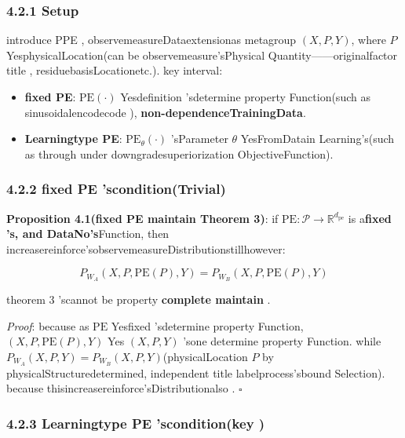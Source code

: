 \documentclass[
  12pt,
]{article}
\providecommand{\tightlist}{%
  \setlength{\itemsep}{0pt}\setlength{\parskip}{0pt}}
\begin{document}
\subsubsection{4.2.1 Setup}\label{ux8bbeux5b9a-1}

introduce  PPE , observemeasureDataextensionas metagroup \((X, P, Y)\), where \(P\)
YesphysicalLocation(can be observemeasure'sPhysical Quantity------originalfactor title , residuebasisLocationetc.). key interval: 

\begin{itemize}
\tightlist
\item
  \textbf{fixed  PE}: \(\text{PE}(\cdot)\)
  Yesdefinition 'sdetermine property Function(such as  sinusoidalencodecode ), \textbf{non-dependenceTrainingData}. 
\item
  \textbf{Learningtype  PE}: \(\text{PE}_\theta(\cdot)\) 'sParameter \(\theta\)
  YesFromDatain Learning's(such as through under downgradesuperiorization ObjectiveFunction). 
\end{itemize}

\subsubsection{4.2.2 fixed  PE
'scondition(Trivial)}\label{ux56faux5b9a-pe-ux7684ux60c5ux51b5trivial}

\textbf{Proposition 4.1(fixed  PE maintain  Theorem 3)}: if 
\(\text{PE}: \mathcal{P} \to \mathbb{R}^{d_{\text{pe}}}\)
is a\textbf{fixed 's, and DataNo's}Function, then increasereinforce'sobservemeasureDistributionstillhowever: 

\[P_{W_A}(X, P, \text{PE}(P), Y) = P_{W_B}(X, P, \text{PE}(P), Y)\]

theorem  3 'scannot be property \textbf{complete maintain }. 

\emph{Proof}: because as  \(\text{PE}\)
Yesfixed 'sdetermine property Function, \((X, P, \text{PE}(P), Y)\) Yes \((X, P, Y)\)
'sone determine property Function. while  \(P_{W_A}(X, P, Y) = P_{W_B}(X, P, Y)\)(physicalLocation
\(P\)
by physicalStructuredetermined, independent title labelprocess'sbound Selection). because thisincreasereinforce'sDistributionalso . \(\square\)

\subsubsection{4.2.3 Learningtype  PE
'scondition(key )}\label{ux5b66ux4e60ux578b-pe-ux7684ux60c5ux51b5ux5173ux952e}
\end{document}
